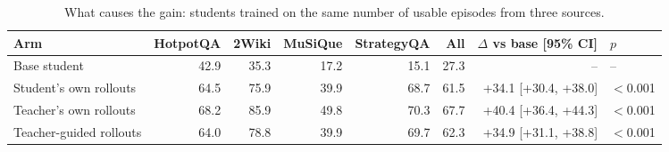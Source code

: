 \begin{table}[t]
\centering
\small
\caption{What causes the gain: students trained on the same number of usable episodes from three sources.}
\label{tab:E01-ablation}
\begin{tabular}{lrrrrrrl}
\toprule
Arm & HotpotQA & 2Wiki & MuSiQue & StrategyQA & All & $\Delta$ vs base [95\% CI] & $p$ \\
\midrule
Base student & 42.9 & 35.3 & 17.2 & 15.1 & 27.3 & -- & -- \\
Student's own rollouts & 64.5 & 75.9 & 39.9 & 68.7 & 61.5 & +34.1 [+30.4, +38.0] & $<$0.001 \\
Teacher's own rollouts & 68.2 & 85.9 & 49.8 & 70.3 & 67.7 & +40.4 [+36.4, +44.3] & $<$0.001 \\
Teacher-guided rollouts & 64.0 & 78.8 & 39.9 & 69.7 & 62.3 & +34.9 [+31.1, +38.8] & $<$0.001 \\
\bottomrule
\end{tabular}
\end{table}
